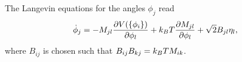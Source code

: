 The Langevin equations for the angles $\phi_j$ read
\begin{equation}
\dot{\phi}_j=-M_{jl}\frac{\partial V(\{\phi_i\})}{\partial \phi_l}+k_BT\frac{\partial M_{jl}}{\partial \phi_l}+\sqrt{2}B_{jl}\eta_l,
\end{equation}
where $B_{ij}$ is chosen such that $B_{ij}B_{kj}=k_BT M_{ik}$.
